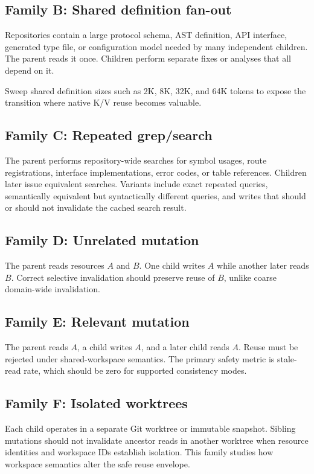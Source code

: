 \documentclass[11pt]{article}
\begin{document}
\subsection{Family B: Shared definition fan-out}

Repositories contain a large protocol schema, AST definition, API interface, generated type file, or configuration model needed by many independent children. The parent reads it once. Children perform separate fixes or analyses that all depend on it.

Sweep shared definition sizes such as 2K, 8K, 32K, and 64K tokens to expose the transition where native K/V reuse becomes valuable.

\subsection{Family C: Repeated grep/search}

The parent performs repository-wide searches for symbol usages, route registrations, interface implementations, error codes, or table references. Children later issue equivalent searches. Variants include exact repeated queries, semantically equivalent but syntactically different queries, and writes that should or should not invalidate the cached search result.

\subsection{Family D: Unrelated mutation}

The parent reads resources $A$ and $B$. One child writes $A$ while another later reads $B$. Correct selective invalidation should preserve reuse of $B$, unlike coarse domain-wide invalidation.

\subsection{Family E: Relevant mutation}

The parent reads $A$, a child writes $A$, and a later child reads $A$. Reuse must be rejected under shared-workspace semantics. The primary safety metric is stale-read rate, which should be zero for supported consistency modes.

\subsection{Family F: Isolated worktrees}

Each child operates in a separate Git worktree or immutable snapshot. Sibling mutations should not invalidate ancestor reads in another worktree when resource identities and workspace IDs establish isolation. This family studies how workspace semantics alter the safe reuse envelope.
\end{document}
